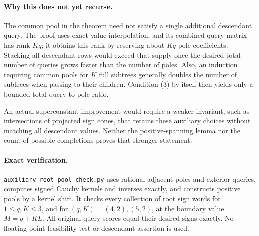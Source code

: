 \documentclass[11pt]{article}
\begin{document}
\paragraph{Why this does not yet recurse.}
The common pool in the theorem need not satisfy a single additional
descendant query. The proof uses exact value interpolation, and its
combined query matrix has rank $Kq$; it obtains this rank by reserving
about $Kq$ pole coefficients. Stacking all descendant rows would
exceed that supply once the desired total number of queries grows
faster than the number of poles. Also, an induction requiring common
pools for $K$ full subtrees generally doubles the number of subtrees
when passing to their children. Condition (3) by itself then yields
only a bounded total query-to-pole ratio.

An actual superconstant improvement would require a weaker invariant,
such as intersections of projected sign cones, that retains these
auxiliary choices without matching all descendant values. Neither the
positive-spanning lemma nor the count of possible completions proves
that stronger statement.

\paragraph{Exact verification.}
\texttt{auxiliary-root-pool-check.py} uses rational adjacent poles and
exterior queries, computes signed Cauchy kernels and inverses exactly,
and constructs positive pools by a kernel shift. It checks every
collection of root sign words for $1\leq q,K\leq3$, and for
$(q,K)=(4,2),(5,2)$, at the boundary value $M=q+KL$.
All original query scores equal their desired signs exactly.
No floating-point feasibility test or descendant assertion is used.
\end{document}
